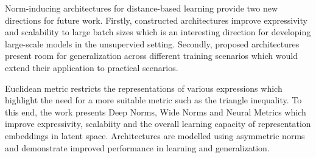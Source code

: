 \documentclass[11pt,letterpaper]{article}
\begin{document}
Norm-inducing architectures for distance-based learning provide two new directions for future work. Firstly, constructed architectures improve expressivity and scalability to large batch sizes which is an interesting direction for developing large-scale models in the unsupervied setting. Secondly, proposed architectures present room for generalization across different training scenarios which would extend their application to practical scenarios. 

Euclidean metric restricts the representations of various expressions which highlight the need for a more suitable metric such as the triangle inequality. To this end, the work presents Deep Norms, Wide Norms and Neural Metrics which improve expressivity, scalabiity and the overall learning capacity of representation embeddings in latent space. Architectures are modelled using asymmetric norms and demonstrate improved performance in learning and generalization. 
\end{document}
